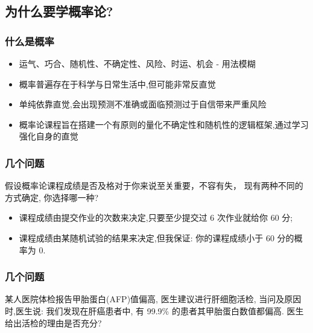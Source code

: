 \documentclass[Prob-All.tex]{subfiles}
\begin{document}
\subsection{为什么要学概率论?}

\begin{frame}
	\frametitle{什么是概率}


		\begin{itemize}[<+-|alert@+>]
			\item 运气、巧合、随机性、不确定性、风险、时运、机会 - 用法模糊
			\item 概率普遍存在于科学与日常生活中,但可能非常反直觉
			\item 单纯依靠直觉,会出现预测不准确或面临预测过于自信带来严重风险
			\item 概率论课程旨在搭建一个有原则的量化不确定性和随机性的逻辑框架,通过学习强化自身的直觉
		\end{itemize}




\end{frame}





\begin{frame}
	\frametitle{几个问题}
	\begin{prob}
		假设概率论课程成绩是否及格对于你来说至关重要，不容有失， 现有两种不同的方式确定, 你选择哪一种?
		\begin{itemize}[<+-|alert@+>]
			\item 课程成绩由提交作业的次数来决定,只要至少提交过 6 次作业就给你 60 分;
			\item 课程成绩由某随机试验的结果来决定,但我保证: 你的课程成绩小于 60 分的概率为 0.
		\end{itemize}

	\end{prob}


\end{frame}


\begin{frame}
	\frametitle{几个问题}

	\begin{prob} 某人医院体检报告甲胎蛋白({\rm AFP})值偏高, 医生建议进行肝细胞活检, 当问及原因时,医生说: 我们发现在肝癌患者中, 有 99.9\% 的患者其甲胎蛋白数值都偏高.  医生给出活检的理由是否充分?
	\end{prob}
\end{frame}
\end{document}
